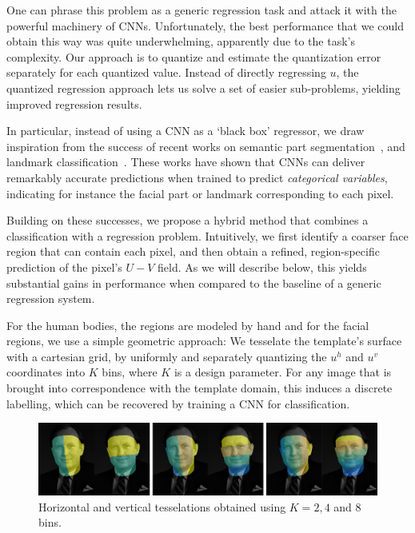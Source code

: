 One can phrase this problem as a generic regression task and attack it with the powerful machinery of CNNs. Unfortunately, the best performance that we could obtain this way was quite underwhelming, apparently due to the task's complexity. Our approach is to quantize and estimate the quantization error separately for each quantized value. Instead of directly regressing $u$, the quantized regression approach lets us solve a set of easier sub-problems, yielding improved regression results.

In particular,	instead of  using a CNN as a `black box' regressor, we draw inspiration from the success of recent works on semantic part  segmentation~\cite{tsogkas2015deep,CP2016Deeplab}, and landmark classification~\cite{bulat2016human,bulat2016two}. These works have shown that CNNs can deliver remarkably accurate predictions when trained to predict \textit{categorical variables}, indicating for instance the facial part or landmark corresponding to each pixel. 
    
Building on these successes, we propose a hybrid method that combines a classification with a regression problem. Intuitively, we first identify a coarser face region that can contain each pixel, and then obtain a refined, region-specific prediction of the pixel's $U-V$  field. As we will describe below, this yields substantial gains in performance when compared to the baseline of a generic regression system. 

For the human bodies, the regions are modeled by hand and for the facial regions, we use a simple geometric approach:
We tesselate the template's surface with a cartesian grid, by uniformly and separately quantizing the $u^h$ and $u^v$ coordinates into $K$ bins, where $K$ is a design parameter. For any image that is brought into correspondence with the template domain, this induces a discrete labelling, which can be recovered by training a  CNN for classification.
    
\begin{figure}[ht]
\begin{center}
    \includegraphics[width=1\linewidth ]{resources/Human_Poses/discreteFaces}
\end{center}
    \caption{Horizontal and vertical tesselations obtained using $K=2,4$ and $8$ bins.}
\label{fig:DiscreteFaces}
\end{figure}

